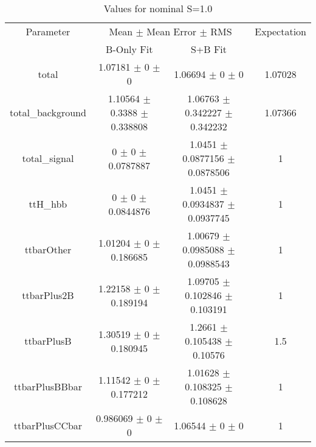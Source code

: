 \begin{table}
\centering
\caption{Values for nominal S=1.0}
\begin{tabular}{cccc}
\toprule
Parameter & \multicolumn{2}{c}{Mean $\pm$ Mean Error $\pm$ RMS} & Expectation\\
 & B-Only Fit & S+B Fit & \\
\midrule
total & \num{1.07181} $\pm$ \num{0} $\pm$ \num{0} & \num{1.06694} $\pm$ \num{0} $\pm$ \num{0} & \num{1.07028}\\
total\_background & \num{1.10564} $\pm$ \num{0.3388} $\pm$ \num{0.338808} & \num{1.06763} $\pm$ \num{0.342227} $\pm$ \num{0.342232} & \num{1.07366}\\
total\_signal & \num{0} $\pm$ \num{0} $\pm$ \num{0.0787887} & \num{1.0451} $\pm$ \num{0.0877156} $\pm$ \num{0.0878506} & \num{1}\\
ttH\_hbb & \num{0} $\pm$ \num{0} $\pm$ \num{0.0844876} & \num{1.0451} $\pm$ \num{0.0934837} $\pm$ \num{0.0937745} & \num{1}\\
ttbarOther & \num{1.01204} $\pm$ \num{0} $\pm$ \num{0.186685} & \num{1.00679} $\pm$ \num{0.0985088} $\pm$ \num{0.0988543} & \num{1}\\
ttbarPlus2B & \num{1.22158} $\pm$ \num{0} $\pm$ \num{0.189194} & \num{1.09705} $\pm$ \num{0.102846} $\pm$ \num{0.103191} & \num{1}\\
ttbarPlusB & \num{1.30519} $\pm$ \num{0} $\pm$ \num{0.180945} & \num{1.2661} $\pm$ \num{0.105438} $\pm$ \num{0.10576} & \num{1.5}\\
ttbarPlusBBbar & \num{1.11542} $\pm$ \num{0} $\pm$ \num{0.177212} & \num{1.01628} $\pm$ \num{0.108325} $\pm$ \num{0.108628} & \num{1}\\
ttbarPlusCCbar & \num{0.986069} $\pm$ \num{0} $\pm$ \num{0} & \num{1.06544} $\pm$ \num{0} $\pm$ \num{0} & \num{1}\\
\bottomrule
\end{tabular}
\end{table}